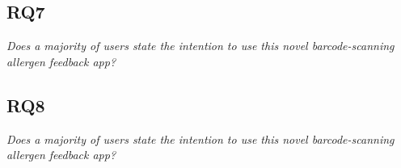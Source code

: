 \subsection{RQ7}
\textit{\large Does a majority of users state the intention to use this novel barcode-scanning allergen feedback app?}\\



\subsection{RQ8}
\textit{\large Does a majority of users state the intention to use this novel barcode-scanning allergen feedback app?}\\



